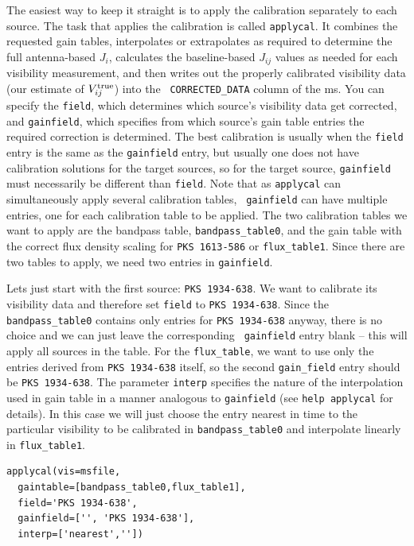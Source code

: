 \documentclass[force,almostfull,justified]{tufte-book}
\begin{document}
The easiest way to keep it straight is to apply the calibration separately to each source.  The task
that applies the calibration is called {\tt applycal}.  It combines the requested gain tables,
interpolates or extrapolates as required to determine the full antenna-based $J_i$, calculates the
baseline-based $J_{ij}$ values as needed for each visibility measurement, and then writes out the
properly calibrated visibility data (our estimate of $V_{ij}^{\rm true}$) into the {\tt
CORRECTED\_DATA} column of the ms.  You can specify the {\tt field}, which determines which source's
visibility data get corrected, and {\tt gainfield}, which specifies from which source's gain table
entries the required correction is determined.  The best calibration is usually when the {\tt field}
entry is the same as the {\tt gainfield} entry, but usually one does not have calibration solutions
for the target sources, so for the target source, {\tt gainfield} must necessarily be different than
{\tt field}.  Note that as {\tt applycal} can simultaneously apply several calibration tables, {\tt
gainfield} can have multiple entries, one for each calibration table to be applied.  The two
calibration tables we want to apply are the bandpass table, {\tt bandpass\_table0}, and the gain table
with the correct flux density scaling for {\tt PKS 1613-586} or {\tt flux\_table1}.  Since there are
two tables to apply, we need two entries in {\tt gainfield}.

Lets just start with the first source: {\tt PKS 1934-638}.  We want to calibrate its visibility data
and therefore set {\tt field} to {\tt PKS 1934-638}.  Since the {\tt bandpass\_table0} contains only
entries for {\tt PKS 1934-638} anyway, there is no choice and we can just leave the corresponding {\tt
gainfield} entry blank -- this will apply all sources in the table.  For the {\tt flux\_table}, we
want to use only the entries derived from {\tt PKS 1934-638} itself, so the second {\tt gain\_field}
entry should be {\tt PKS 1934-638}.  The parameter {\tt interp} specifies the nature of the
interpolation used in gain table in a manner analogous to {\tt gainfield} (see {\tt help applycal} for
details).  In this case we will just choose the entry nearest in time to the particular visibility to
be calibrated in {\tt bandpass\_table0} and interpolate linearly in {\tt flux\_table1}.

\begin{casacmd}
\begin{verbatim}
applycal(vis=msfile,
  gaintable=[bandpass_table0,flux_table1],
  field='PKS 1934-638',
  gainfield=['', 'PKS 1934-638'],
  interp=['nearest',''])
\end{verbatim}
\end{casacmd}
\end{document}

